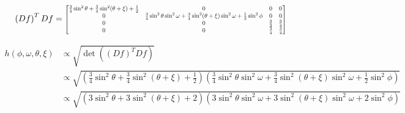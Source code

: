 \documentclass[12pt]{article}
\newcommand*{\Scale}[2][4]{\scalebox{#1}{$#2$}}%
\begin{document}
\begin{align}
 \left(Df\right)^TDf &= \Scale[0.70]{\begin{bmatrix} 
 \frac{3}{4}\sin^2\theta + \frac{3}{4}\sin^2(\theta+\xi) + \frac{1}{2} & 0 & 0 & 0 \\
 0 & \frac{3}{4}\sin^2\theta \sin^2\omega + \frac{3}{4}\sin^2(\theta+\xi) \sin^2\omega + \frac{1}{2}\sin^2\phi & 0 & 0\\
 0 & 0 & \frac{3}{2} & \frac{3}{4}\\
 0 & 0 & \frac{3}{4} & \frac{3}{4}
\end{bmatrix}} 
\end{align} 

\begin{align}
h(\phi, \omega, \theta, \xi) &\propto \sqrt{\det\left(\left(Df\right)^TDf\right)} \\
&\propto \sqrt{\left( \frac{3}{4}\sin^2\theta + \frac{3}{4}\sin^2(\theta+\xi) + \frac{1}{2} \right)\left(\frac{3}{4}\sin^2\theta \sin^2\omega + \frac{3}{4}\sin^2(\theta+\xi) \sin^2\omega + \frac{1}{2}\sin^2\phi\right)} \\
&\propto \sqrt{\left(3\sin^2\theta + 3\sin^2(\theta+\xi) + 2\right)\left(3\sin^2\theta \sin^2\omega + 3\sin^2(\theta+\xi) \sin^2\omega + 2\sin^2\phi\right)}
\end{align}
\end{document}
